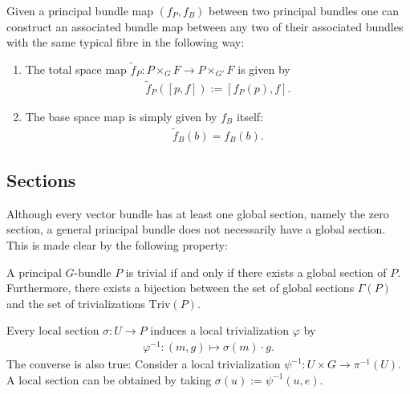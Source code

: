     \begin{construct}
        Given a principal bundle map $(f_P,f_B)$ between two principal bundles one can construct an associated bundle map between any two of their associated bundles with the same typical fibre in the following way:
        \begin{enumerate}
            \item The total space map $\widetilde{f}_P:P\times_G F\rightarrow P\times_{G'} F$ is given by
                \begin{gather}
                    \widetilde{f}_P([p, f]) := [f_P(p), f].
                \end{gather}
            \item The base space map is simply given by $f_B$ itself:
                \begin{gather}
                    \widetilde{f}_B(b) = f_B(b).
                \end{gather}
        \end{enumerate}
    \end{construct}

\subsection{Sections}

    Although every vector bundle has at least one global section, namely the zero section, a general principal bundle does not necessarily have a global section. This is made clear by the following property:
    \begin{property}
        A principal $G$-bundle $P$ is trivial if and only if there exists a global section of $P$. Furthermore, there exists a bijection between the set of global sections $\Gamma(P)$ and the set of trivializations $\text{Triv}(P)$.
    \end{property}
    \begin{result}\label{diff:prin_section_triv}
        Every local section $\sigma:U\rightarrow P$ induces a local trivialization $\varphi$ by
        \begin{gather}
            \varphi^{-1}:(m, g)\mapsto \sigma(m)\cdot g.
        \end{gather}
        The converse is also true: Consider a local trivialization $\psi^{-1}:U\times G\rightarrow \pi^{-1}(U)$. A local section can be obtained by taking $\sigma(u):=\psi^{-1}(u, e)$.
    \end{result}

